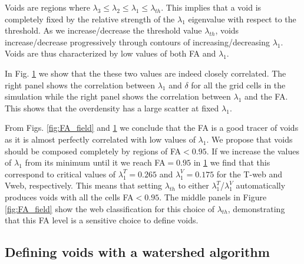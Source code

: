 \documentclass[a4,useAMS,usenatbib,usegraphicx]{mn2e}
\begin{document}
\begin{figure}
  

  \label{fig:L1_correlations}

\end{figure}


Voids are regions where $\lambda_3\leq\lambda_2\leq
\lambda_1\leq\lambda_{th}$. 
This implies that a void is completely fixed by the relative strength
of the $\lambda_1$ eigenvalue with respect to the threshold.   
As we increase/decrease the threshold value $\lambda_{th}$, voids
increase/decrease progressively through contours of
increasing/decreasing $\lambda_1$.  
Voids are thus characterized by low values of both FA and
$\lambda_1$.  

In Fig. \ref{fig:L1_correlations} we show that the these two values
are indeed closely correlated.  
The right panel shows the correlation between $\lambda_1$ and $\delta$ for
all the grid cells in the simulation while the right panel shows the
correlation between $\lambda_1$ and the FA. This shows that the
overdensity has a large scatter at fixed $\lambda_1$. 

From Figs. \ref{fig:FA_field} and \ref{fig:L1_correlations} we
conclude that the FA is a good tracer of voids as it is almost perfectly
correlated with low values of $\lambda_1$. 
We propose that voids should be composed completely by regions of
FA$<0.95$.
If we increase the values of $\lambda_1$ from its minimum until it
we reach FA$=0.95$ in \ref{fig:L1_correlations} we find that this
correspond to critical values of $\lambda_{1}^T = 0.265$ and
$\lambda_{1}^V = 0.175$ for the T-web and Vweb, respectively.
This means that setting $\lambda_{th}$ to either
$\lambda_{1}^T$/$\lambda_{1}^{V}$ automatically produces voids with
all the cells FA$<0.95$.   
The middle panels in Figure \ref{fig:FA_field} show the web
classification for this choice of $\lambda_{th}$, demonstrating that
this FA level is a sensitive choice to define voids.

   
\subsection{Defining voids with a watershed algorithm}
\label{sec:watershed}
\end{document}
